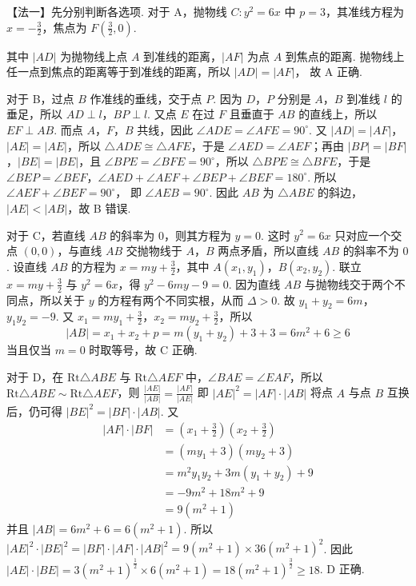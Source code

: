 \begin{solution}
【法一】先分别判断各选项. 对于 A，抛物线 \(C: y^2 = 6x\) 中 \(p = 3\)，其准线方程为 \(x = -\frac{3}{2}\)，焦点为 \(F\left(\frac{3}{2},0\right)\).


其中 \(|AD|\) 为抛物线上点 \(A\) 到准线的距离，\(|AF|\) 为点 \(A\) 到焦点的距离. 抛物线上任一点到焦点的距离等于到准线的距离，所以
\(|AD| = |AF|\)，
故 A 正确.

对于 B，过点 \(B\) 作准线的垂线，交于点 \(P\). 因为 \(D\)，\(P\) 分别是 \(A\)，\(B\) 到准线 \(l\) 的垂足，所以 \(AD \perp l\)，\(BP \perp l\). 又点 \(E\) 在过 \(F\) 且垂直于 \(AB\) 的直线上，所以 \(EF \perp AB\). 而点 \(A\)，\(F\)，\(B\) 共线，因此
\(\angle ADE=\angle AFE=90^\circ\).
又 \(|AD| = |AF|\)，\(|AE| = |AE|\)，所以 \(\triangle ADE \cong \triangle AFE\)，于是 \(\angle AED = \angle AEF\)；再由 \(|BP| = |BF|\)，\(|BE| = |BE|\)，且 \(\angle BPE = \angle BFE = 90^\circ\)，所以 \(\triangle BPE \cong \triangle BFE\)，于是 \(\angle BEP = \angle BEF\)，\(\angle AED + \angle AEF + \angle BEP + \angle BEF = 180^\circ\).
所以
\(\angle AEF + \angle BEF = 90^\circ\)，
即 \(\angle AEB = 90^\circ\). 因此 \(AB\) 为 \(\triangle ABE\) 的斜边，\(|AE| < |AB|\)，故 B 错误.

对于 C，若直线 \(AB\) 的斜率为 \(0\)，则其方程为 \(y=0\). 这时 \(y^2=6x\) 只对应一个交点 \((0,0)\)，与直线 \(AB\) 交抛物线于 \(A\)，\(B\) 两点矛盾，所以直线 \(AB\) 的斜率不为 \(0\). 设直线 \(AB\) 的方程为 \(x = my + \frac{3}{2}\)，其中 \(A(x_1, y_1)\)，\(B(x_2, y_2)\). 联立 \(x = my + \frac{3}{2}\) 与 \(y^2 = 6x\)，得
\(y^2 - 6my - 9 = 0\).
因为直线 \(AB\) 与抛物线交于两个不同点，所以关于 \(y\) 的方程有两个不同实根，从而 \(\Delta > 0\). 故 \(y_1 + y_2 = 6m\)，\(y_1y_2 = -9\). 又 \(x_1 = my_1 + \frac{3}{2}\)，\(x_2 = my_2 + \frac{3}{2}\)，所以
\[
|AB|=x_1+x_2+p=m(y_1+y_2)+3+3=6m^2+6\ge 6
\]
当且仅当 \(m = 0\) 时取等号，故 C 正确.

对于 D，在 \(\mathrm{Rt}\triangle ABE\) 与 \(\mathrm{Rt}\triangle AEF\) 中，\(\angle BAE = \angle EAF\)，所以 \(\mathrm{Rt}\triangle ABE \sim \mathrm{Rt}\triangle AEF\)，则
\(
\frac{|AE|}{|AB|}=\frac{|AF|}{|AE|}
\)
即
\(
|AE|^2=|AF| \cdot |AB|
\)
将点 \(A\) 与点 \(B\) 互换后，仍可得 \( |BE|^2 = |BF| \cdot |AB| \). 又
\begin{align*}
    |AF| \cdot |BF|
    &=\left(x_1 + \frac{3}{2}\right)\left(x_2 + \frac{3}{2}\right) \\
    &=(my_1 + 3)(my_2 + 3) \\
    &=m^2 y_1 y_2 + 3m(y_1 + y_2) + 9 \\
    &=-9m^2 + 18m^2 + 9 \\
    &=9(m^2 + 1)
\end{align*}
并且 \(|AB| = 6m^2 + 6 = 6(m^2 + 1)\).
所以 \(|AE|^2 \cdot |BE|^2 = |BF| \cdot |AF| \cdot |AB|^2 = 9(m^2 + 1) \times 36(m^2 + 1)^2\).
因此 \(|AE| \cdot |BE| = 3(m^2 + 1)^{\frac{1}{2}} \times 6(m^2 + 1) = 18(m^2 + 1)^{\frac{3}{2}} \ge 18\).
D 正确.


\end{solution}

